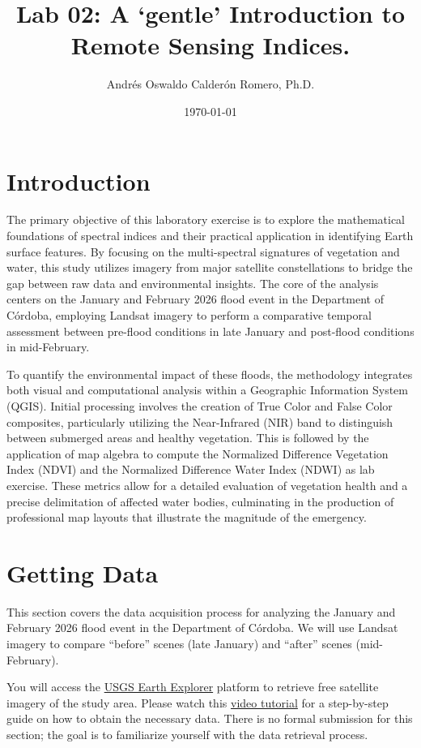 \documentclass{article}
\title{Lab 02: A `gentle' Introduction to Remote Sensing Indices.}
\author{Andrés Oswaldo Calderón Romero, Ph.D.}
\date{\today}
\begin{document}
\maketitle

\section{Introduction}
The primary objective of this laboratory exercise is to explore the mathematical foundations of spectral indices and their practical application in identifying Earth surface features. By focusing on the multi-spectral signatures of vegetation and water, this study utilizes imagery from major satellite constellations to bridge the gap between raw data and environmental insights. The core of the analysis centers on the January and February 2026 flood event in the Department of Córdoba, employing Landsat imagery to perform a comparative temporal assessment between pre-flood conditions in late January and post-flood conditions in mid-February.

To quantify the environmental impact of these floods, the methodology integrates both visual and computational analysis within a Geographic Information System (QGIS). Initial processing involves the creation of True Color and False Color composites, particularly utilizing the Near-Infrared (NIR) band to distinguish between submerged areas and healthy vegetation. This is followed by the application of map algebra to compute the Normalized Difference Vegetation Index (NDVI) and the Normalized Difference Water Index (NDWI) as lab exercise. These metrics allow for a detailed evaluation of vegetation health and a precise delimitation of affected water bodies, culminating in the production of professional map layouts that illustrate the magnitude of the emergency.

\section{Getting Data}
This section covers the data acquisition process for analyzing the January and February 2026 flood event in the Department of Córdoba. We will use Landsat imagery to compare ``before'' scenes (late January) and ``after'' scenes (mid-February).

You will access the \href{https://earthexplorer.usgs.gov/}{USGS Earth Explorer} platform to retrieve free satellite imagery of the study area. Please watch this \href{https://youtu.be/LaYln0x99Ow}{video tutorial} for a step-by-step guide on how to obtain the necessary data. There is no formal submission for this section; the goal is to familiarize yourself with the data retrieval process.
\end{document}
